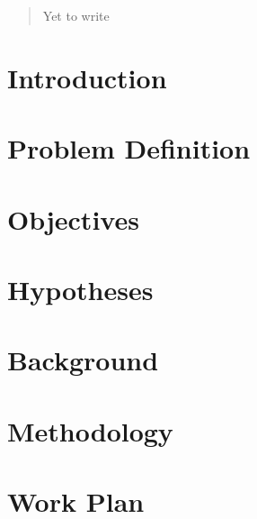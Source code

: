 \documentclass[11pt]{article}
\begin{document}
\propportada                        %
\proppagfirmas                      %
\thispagestyle{empty}
\tableofcontents                    %
\newpage
\sloppy
\newpage


\begin{abstract}
Yet to write

\begin{comment}
Normalmente, cuando se presenta un documento de este tipo o un artículo, es
importante incluir un {\it Resumen}, que en alrededor de 200 palabras 
informa al
lector los aspectos más relevantes del trabajo. Esto es de importancia, por
ejemplo, para buscar bibliografía o seleccionar aquellos documentos que en
determinado momento son de interés para alguien.  

Las preguntas a contestar en el Resumen son las siguientes:
\begin{itemize}
	\item ?`Para qué Maestría es la Propuesta?
	\item ?`Cuál es la el contexto y situación problemática en la que se encuentra?
	\item ?`Qué problema particular se piensa resolver? ¿por qué se quiere
	  resolver  y para qué?
	\item ?`Qué se ha hecho antes?
	\item ?`Cómo se piensa resolver?
	\item ?`Qué se espera obtener?
\end{itemize}
\end{comment}
\end{abstract}


\section{Introduction}


\section{Problem Definition}


\section{Objectives}


\section{Hypotheses}


\section{Background}


\section{Methodology}


\section{Work Plan}




\end{document}
